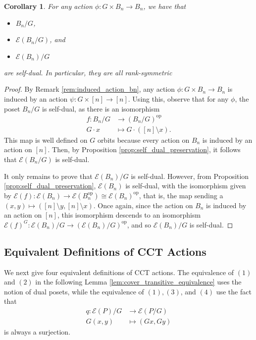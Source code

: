 \documentclass[smallextended, envcountsame, numbook]{svjour3}
\theoremstyle{plain}
\newtheorem{cor}[thm]{Corollary}
\theoremstyle{definition}
\theoremstyle{remark}
\numberwithin{equation}{section}
\newcommand\ssec{\subsection}
\newcommand\op{\operatorname{op}}
\begin{document}
\begin{cor}
\label{cor:duality_bn_quotients}
For any action $\phi\colon G \times B_n \rightarrow B_n$, we have that
\begin{itemize}
	\item $B_n/G$,
	\item $\mathcal E(B_n/G)$, and
	\item $\mathcal E(B_n)/G$
\end{itemize} are self-dual. In particular, they are all rank-symmetric 
\end{cor}
\begin{proof}
By Remark \ref{rem:induced_action_bn}, any action $\phi\colon G\times B_n \rightarrow B_n$ is induced by an action $\psi\colon G \times [n] \rightarrow [n]$. Using this, observe that for any $\phi$, the poset $B_n/G$ is self-dual, as there is an isomorphism 
\begin{align*}
	f\colon B_n/G &\rightarrow (B_n/G)^{\op} \\
	G \cdot x &\mapsto G \cdot ([n] \setminus x).
\end{align*}
This map is well defined on $G$ orbits because every action on $B_n$ is induced by an action on $[n]$. Then, by Proposition \ref{prop:self_dual_preservation}, it follows that $\mathcal E(B_n/G)$ is self-dual.

It only remains to prove that $\mathcal E(B_n)/G$ is self-dual. However, from Proposition \ref{prop:self_dual_preservation}, $\mathcal E(B_n)$ is self-dual, with the isomorphism given by $\mathcal E(f)\colon\mathcal E(B_n) \rightarrow \mathcal E(B_n^{\op})\cong \mathcal E(B_n)^{\op}$, that is, the map sending a $(x,y) \mapsto ([n]\setminus y,[n] \setminus x)$. Once again, since the action on $B_n$ is induced by an action on $[n]$, this isomorphism descends to an isomorphism $\mathcal E(f)^G\colon\mathcal E(B_n)/G \rightarrow  (\mathcal{E}(B_n)/G)^{\op}$, and so $\mathcal E(B_n)/G$ is self-dual.
\end{proof}

\ssec{Equivalent Definitions of CCT Actions}
\label{ssec:equivalent_defs}

We next give four equivalent definitions of CCT actions. The equivalence of $(1)$ and $(2)$ in the following Lemma \ref{lem:cover_transitive_equivalence} uses the notion of dual posets, while the equivalence of $(1),(3)$, and $(4)$ use the fact that 
\begin{align*}
q\colon\mathcal E(P)/G &\rightarrow \mathcal E(P/G)\\
G(x,y) &\mapsto (Gx,Gy)
\end{align*}
 is always a surjection.
\end{document}
